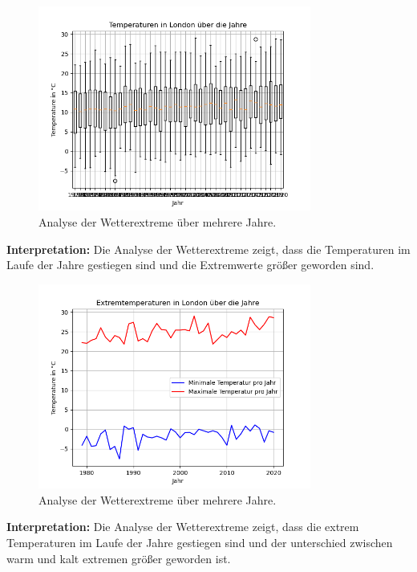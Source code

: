 \documentclass{article}
\begin{document}
\begin{figure}[h!]
    \centering
    \includegraphics[width=0.8\textwidth]{A_1_3.png}
    \caption{Analyse der Wetterextreme über mehrere Jahre.}
\end{figure}

\textbf{Interpretation:} Die Analyse der Wetterextreme zeigt, dass die Temperaturen im Laufe der Jahre gestiegen sind und die Extremwerte größer geworden sind.

\begin{figure}[h!]
    \centering
    \includegraphics[width=0.8\textwidth]{A_1_3_extreme.png}
    \caption{Analyse der Wetterextreme über mehrere Jahre.}
\end{figure}

\textbf{Interpretation:} Die Analyse der Wetterextreme zeigt, dass die extrem Temperaturen im Laufe der Jahre gestiegen sind und der unterschied zwischen warm und kalt
extremen größer geworden ist.

\newpage
\end{document}
